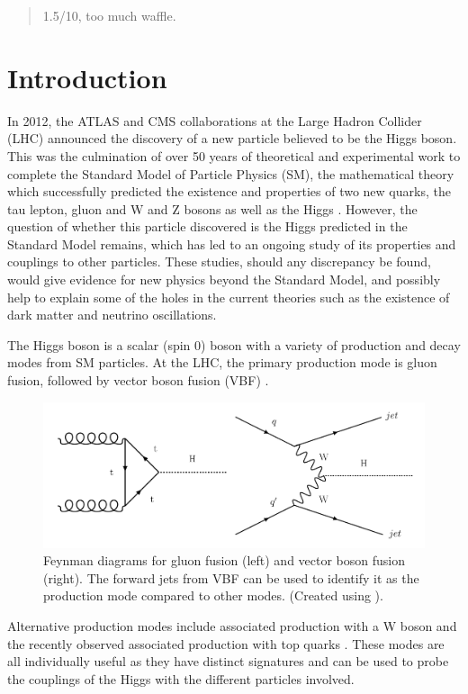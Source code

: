 \documentclass[12pt]{article}
\begin{document}
\begin{abstract}
1.5/10, too much waffle.
\end{abstract}

\section*{Introduction}
In 2012, the ATLAS \cite{atlasann} and CMS \cite{cmsannouncement} collaborations at the Large Hadron Collider (LHC) announced the discovery of a new particle believed to be the Higgs boson. This was the culmination of over 50 years of theoretical and experimental work to complete the Standard Model of Particle Physics (SM), the mathematical theory which successfully predicted the existence and properties of two new quarks, the tau lepton, gluon and W and Z bosons as well as the Higgs \cite{smpredictions}. However, the question of whether this particle discovered is the Higgs predicted in the Standard Model remains, which has led to an ongoing study of its properties and couplings to other particles. These studies, should any discrepancy be found, would give evidence for new physics beyond the Standard Model, and possibly help to explain some of the holes in the current theories such as the existence of dark matter and neutrino oscillations.

The Higgs boson is a scalar (spin 0) boson with a variety of production and decay modes from SM particles. At the LHC, the primary production mode is gluon fusion, followed by vector boson fusion (VBF) \cite{higgsproduction}. 

\begin{figure}[H]
\centering
\includegraphics[width=12cm]{form.png}
\caption{Feynman diagrams for gluon fusion (left) and vector boson fusion (right). The forward jets from VBF can be used to identify it as the production mode compared to other modes. (Created using \cite{feynmanmaker}).}
	\label{form}
\end{figure}

Alternative production modes include associated production with a W boson and the recently observed associated production with top quarks \cite{tth}. These modes are all individually useful as they have distinct signatures and can be used to probe the couplings of the Higgs with the different particles involved. 
\end{document}
